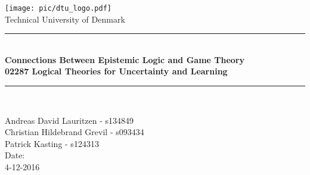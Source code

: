 \begin{titlepage}
\begin{center}
\texttt{[image: pic/dtu\_logo.pdf]}\\
\huge Technical University of Denmark
\end{center}
\vspace{-2cm}
\begin{center}
\vspace*{3cm}
\rule{\textwidth}{1mm}\\
\vspace{0.7cm}
\huge\bfseries Connections Between Epistemic Logic and Game Theory\\[2mm]
\Large  02287 Logical Theories for Uncertainty and Learning \\
\vspace{0.3cm}
\rule{\textwidth}{1mm}\\
\vspace{1.2cm}
\vspace{1.5cm}
\end{center}
\begin{center}
\Large Andreas David Lauritzen - s134849\\
\Large Christian Hildebrand Grevil - 	s093434\\
\Large Patrick Kasting - s124313\\
\vspace{5cm}
Date:\\ 4-12-2016
\end{center}
\end{titlepage}
